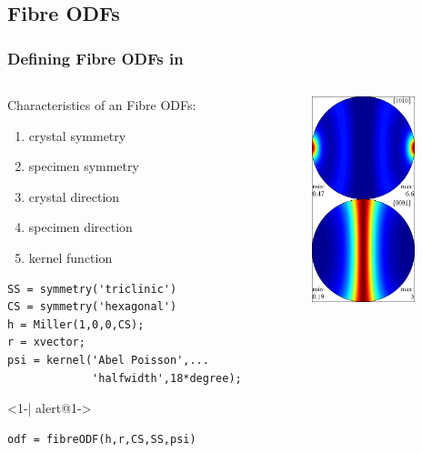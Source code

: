 \subsection*{Fibre ODFs}

\begin{frame}[fragile]
  \frametitle{Defining Fibre ODFs in \MTEX}

  \begin{columns}

    \begin{column}{8.5cm}

      Characteristics of an Fibre ODFs:
      \begin{enumerate}
      \item crystal symmetry
      \item specimen symmetry
      \item crystal direction
      \item specimen direction
      \item kernel function
      \end{enumerate}


\begin{lstlisting}
SS = symmetry('triclinic')
CS = symmetry('hexagonal')
h = Miller(1,0,0,CS);
r = xvector;
psi = kernel('Abel Poisson',...
             'halfwidth',18*degree);
\end{lstlisting}

      \begin{actionenv}<1-| alert@1->
\begin{lstlisting}
odf = fibreODF(h,r,CS,SS,psi)
\end{lstlisting}
      \end{actionenv}

\end{column}

    \begin{column}{3cm}
      \includegraphics[width=3cm]{pic/fibreODF}
    \end{column}
  \end{columns}


\end{frame}

